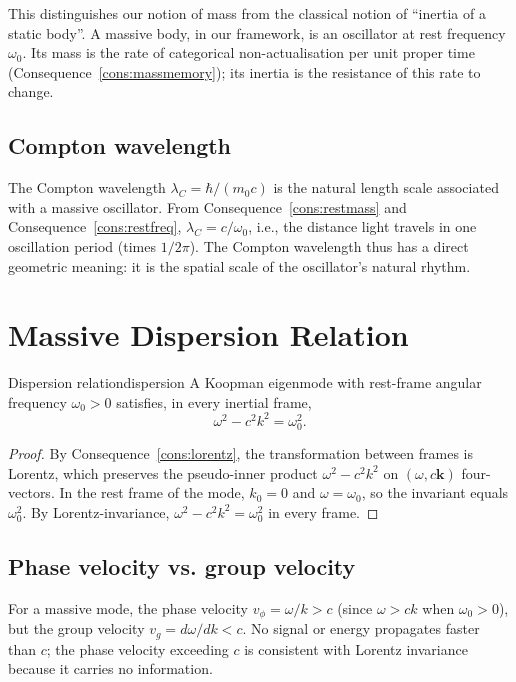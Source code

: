 This distinguishes our notion of mass from the classical notion of ``inertia of a static body''. A massive body, in our framework, is an oscillator at rest frequency $\omega_{0}$. Its mass is the rate of categorical non-actualisation per unit proper time (Consequence~\ref{cons:massmemory}); its inertia is the resistance of this rate to change.

\subsection{Compton wavelength}

The Compton wavelength $\lambda_{C}=\hbar/(m_{0}c)$ is the natural length scale associated with a massive oscillator. From Consequence~\ref{cons:restmass} and Consequence~\ref{cons:restfreq}, $\lambda_{C}=c/\omega_{0}$, i.e., the distance light travels in one oscillation period (times $1/2\pi$). The Compton wavelength thus has a direct geometric meaning: it is the spatial scale of the oscillator's natural rhythm.

\section{Massive Dispersion Relation}
\label{sec:dispersion}

\begin{consequence}{Dispersion relation}{dispersion}
A Koopman eigenmode with rest-frame angular frequency $\omega_{0}>0$ satisfies, in every inertial frame,
\begin{equation}
\omega^{2}-c^{2}k^{2}=\omega_{0}^{2}.
\label{eq:dispersion-ch06}
\end{equation}
\end{consequence}

\begin{proof}
By Consequence~\ref{cons:lorentz}, the transformation between frames is Lorentz, which preserves the pseudo-inner product $\omega^{2}-c^{2}k^{2}$ on $(\omega,c\mathbf{k})$ four-vectors. In the rest frame of the mode, $k_{0}=0$ and $\omega=\omega_{0}$, so the invariant equals $\omega_{0}^{2}$. By Lorentz-invariance, $\omega^{2}-c^{2}k^{2}=\omega_{0}^{2}$ in every frame.
\end{proof}

\subsection{Phase velocity vs. group velocity}

For a massive mode, the phase velocity $v_{\phi}=\omega/k>c$ (since $\omega>ck$ when $\omega_{0}>0$), but the group velocity $v_{g}=d\omega/dk<c$. No signal or energy propagates faster than $c$; the phase velocity exceeding $c$ is consistent with Lorentz invariance because it carries no information.

